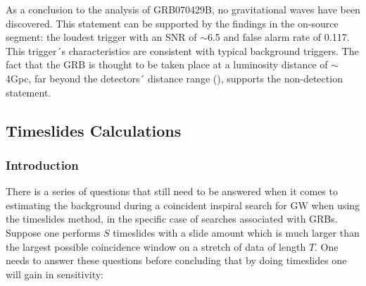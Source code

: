 \documentclass[epsf]{article}
\begin{document}
As a conclusion to the analysis of GRB070429B, no gravitational waves have been discovered. This statement can be supported by the findings in the on-source segment: the loudest trigger with an SNR of $\sim$6.5 and false alarm rate of 0.117. This trigger´s characteristics are consistent with typical background triggers. The fact that the GRB is thought to be taken place at a luminosity distance of $\sim$4Gpc, far beyond the detectors´ distance range (\cite{abbott2006,abbott2007,grb}), supports the non-detection statement.

\subsection{Timeslides Calculations}

\subsubsection{Introduction}
There is a series of questions that still need to be answered when it comes to estimating the background during a coincident inspiral search for GW when using the timeslides method, in the specific case of searches associated with GRBs. Suppose one performs $S$ timeslides with a slide amount which is much larger than the largest possible coincidence window on a stretch of data of length $T$. One needs to answer these questions before concluding that by doing timeslides one will gain in sensitivity:
\end{document}
